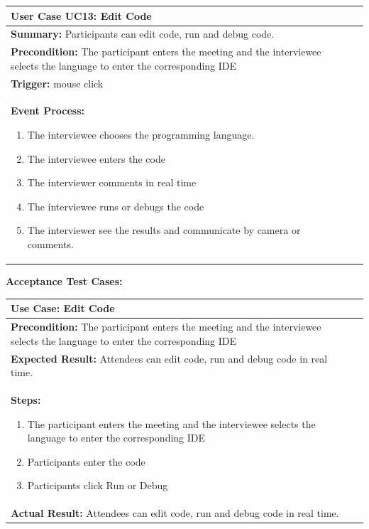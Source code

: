 \documentclass{article}
\begin{document}
  \begin{tabularx}{0.9\textwidth} { 
    | >{\raggedright\arraybackslash}X 
    | >{\centering\arraybackslash}X | }
   \hline
   \textbf{User Case UC13: Edit Code} \\
   \hline
   \textbf{Summary:} Participants can edit code, run and debug code.\\
   \hline
   \textbf{Precondition:} The participant enters the meeting and the interviewee selects the language to enter the corresponding IDE\\
   \hline
   \textbf{Trigger:} mouse click\\
   \hline
   \textbf{Event Process:}
   \begin{enumerate}
    \item The interviewee chooses the programming language.
    \item The interviewee enters the code
    \item The interviewer comments in real time
    \item The interviewee runs or debugs the code
    \item The interviewer see the results and communicate by camera or comments.
   \end{enumerate}\\
   \hline
  \end{tabularx}


\newpage
  \textbf{Acceptance Test Cases: }\par

  \begin{tabularx}{0.9\textwidth} { 
    | >{\raggedright\arraybackslash}X 
    | >{\centering\arraybackslash}X | }
   \hline
   \textbf{Use Case: Edit Code} \\
   \hline
   \textbf{Precondition:} The participant enters the meeting and the interviewee selects the language to enter the corresponding IDE\\
   \hline
   \textbf{Expected Result:} Attendees can edit code, run and debug code in real time.\\
   \hline
   \textbf{Steps:}
   \begin{enumerate}
    \item The participant enters the meeting and the interviewee selects the language to enter the corresponding IDE
    \item Participants enter the code
    \item Participants click Run or Debug
   \end{enumerate}\\
   \hline
   \textbf{Actual Result:} Attendees can edit code, run and debug code in real time.\\
   \hline
  \end{tabularx}
\end{document}

